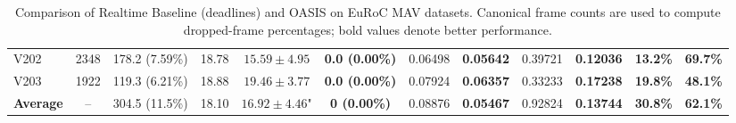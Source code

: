 \begin{table}[htbp]
{\begin{tabular}{l|c|cc|cc|cc|cc|cc}
V202 & 2348 & 178.2 (7.59\%) & 18.78 & $15.59 \pm 4.95$ & \textbf{0.0 (0.00\%)} & 0.06498 & \textbf{0.05642} & 0.39721 & \textbf{0.12036} & \textbf{13.2\%} & \textbf{69.7\%} \\
V203 & 1922 & 119.3 (6.21\%) & 18.88 & $19.46 \pm 3.77$ & \textbf{0.0 (0.00\%)} & 0.07924 & \textbf{0.06357} & 0.33233 & \textbf{0.17238} & \textbf{19.8\%} & \textbf{48.1\%} \\
\hline
\textbf{Average} & -- & 304.5 (11.5\%) & 18.10 & $16.92 \pm 4.46$" & \textbf{0 (0.00\%)} & 0.08876 & \textbf{0.05467} & 0.92824 & \textbf{0.13744} & \textbf{30.8\%} & \textbf{62.1\%} \\
\hline
\hline
\end{tabular}}
\caption{Comparison of Realtime Baseline (deadlines) and OASIS on EuRoC MAV datasets. Canonical frame counts are used to compute dropped-frame percentages; bold values denote better performance.}
\label{tab:super_table_results}
\end{table}
